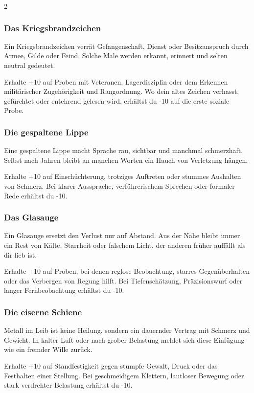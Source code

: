 {\begin{multicols*}{2}
        \subsubsection*{Das Kriegsbrandzeichen}
        Ein Kriegsbrandzeichen verrät Gefangenschaft, Dienst oder Besitzanspruch durch Armee, Gilde oder Feind. Solche Male werden erkannt, erinnert und selten neutral gedeutet.

        \malspielwertebox
        {Erhalte +10 auf Proben mit Veteranen, Lagerdisziplin oder dem Erkennen militärischer Zugehörigkeit und Rangordnung.}
        {Wo dein altes Zeichen verhasst, gefürchtet oder entehrend gelesen wird, erhältst du -10 auf die erste soziale Probe.}

        \subsubsection*{Die gespaltene Lippe}
        Eine gespaltene Lippe macht Sprache rau, sichtbar und manchmal schmerzhaft. Selbst nach Jahren bleibt an manchen Worten ein Hauch von Verletzung hängen.

        \malspielwertebox
        {Erhalte +10 auf Einschüchterung, trotziges Auftreten oder stummes Aushalten von Schmerz.}
        {Bei klarer Aussprache, verführerischem Sprechen oder formaler Rede erhältst du -10.}

        \subsubsection*{Das Glasauge}
        Ein Glasauge ersetzt den Verlust nur auf Abstand. Aus der Nähe bleibt immer ein Rest von Kälte, Starrheit oder falschem Licht, der anderen früher auffällt als dir lieb ist.

        \malspielwertebox
        {Erhalte +10 auf Proben, bei denen reglose Beobachtung, starres Gegenüberhalten oder das Verbergen von Regung hilft.}
        {Bei Tiefenschätzung, Präzisionswurf oder langer Fernbeobachtung erhältst du -10.}

        \subsubsection*{Die eiserne Schiene}
        Metall im Leib ist keine Heilung, sondern ein dauernder Vertrag mit Schmerz und Gewicht. In kalter Luft oder nach grober Belastung meldet sich diese Einfügung wie ein fremder Wille zurück.

        \malspielwertebox
        {Erhalte +10 auf Standfestigkeit gegen stumpfe Gewalt, Druck oder das Festhalten einer Stellung.}
        {Bei geschmeidigem Klettern, lautloser Bewegung oder stark verdrehter Belastung erhältst du -10.}


\end{multicols*}}
